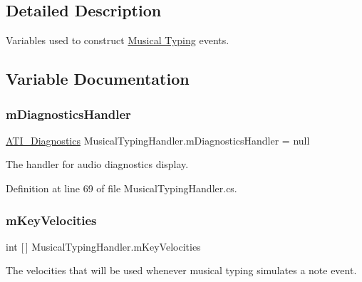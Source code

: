 \subsection{Detailed Description}
Variables used to construct \hyperlink{group___mus_typ}{Musical Typing} events. 

\subsection{Variable Documentation}
\mbox{\label{group___mus_typ_priv_var_gaaeabcb1c6445b0ff93059036cc4ec1f4}} 
\subsubsection{\texorpdfstring{m\+Diagnostics\+Handler}{mDiagnosticsHandler}}
{\footnotesize\ttfamily \hyperlink{group___audio_testing_class_a_t_i___diagnostics}{A\+T\+I\+\_\+\+Diagnostics} Musical\+Typing\+Handler.\+m\+Diagnostics\+Handler = null\hspace{0.3cm}{\ttfamily [private]}}



The handler for audio diagnostics display. 



Definition at line 69 of file Musical\+Typing\+Handler.\+cs.

\mbox{\label{group___mus_typ_priv_var_ga4836c9fe1805279497f421a29879bf5a}} 
\subsubsection{\texorpdfstring{m\+Key\+Velocities}{mKeyVelocities}}
{\footnotesize\ttfamily int \mbox{[}$\,$\mbox{]} Musical\+Typing\+Handler.\+m\+Key\+Velocities\hspace{0.3cm}{\ttfamily [private]}}



The velocities that will be used whenever musical typing simulates a note event. 



